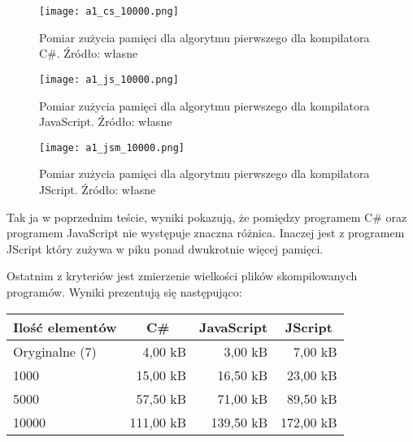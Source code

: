 \begin{figure}[!h]
  \centering
  \texttt{[image: a1\_cs\_10000.png]}
  \caption{Pomiar zużycia pamięci dla algorytmu pierwszego dla kompilatora C\#. Źródło: własne}
  \label{fig:a}
\end{figure}

\begin{figure}[!h]
  \centering
  \texttt{[image: a1\_js\_10000.png]}
  \caption{Pomiar zużycia pamięci dla algorytmu pierwszego dla kompilatora JavaScript. Źródło: własne}
  \label{fig:a}
\end{figure}

\begin{figure}[!h]
  \centering
  \texttt{[image: a1\_jsm\_10000.png]}
  \caption{Pomiar zużycia pamięci dla algorytmu pierwszego dla kompilatora JScript. Źródło: własne}
  \label{fig:a}
\end{figure}

\newpage
\par Tak ja w poprzednim teście, wyniki pokazują, że pomiędzy programem C\# oraz programem JavaScript nie występuje znaczna różnica. Inaczej jest z programem JScript który zużywa w piku ponad dwukrotnie więcej pamięci.

\par Ostatnim z kryteriów jest zmierzenie wielkości plików skompilowanych programów. Wyniki prezentują się następująco:

\begin{table}[h!]
  \centering
  \begin{tabular}{|l|r|r|r|}
  \hline
  \multicolumn{1}{|c|}{Ilość elementów} & \multicolumn{1}{|c|}{C\#} & \multicolumn{1}{|c|}{JavaScript}& \multicolumn{1}{|c|}{JScript} \\ \hline
  Oryginalne (7)  & 4,00 kB & 3,00 kB & 7,00 kB \\ \hline
  1000            & 15,00 kB & 16,50 kB & 23,00 kB \\ \hline
  5000            & 57,50 kB & 71,00 kB & 89,50 kB \\ \hline
  10000           & 111,00 kB & 139,50 kB & 172,00 kB \\ \hline
  \end{tabular}
\end{table}


